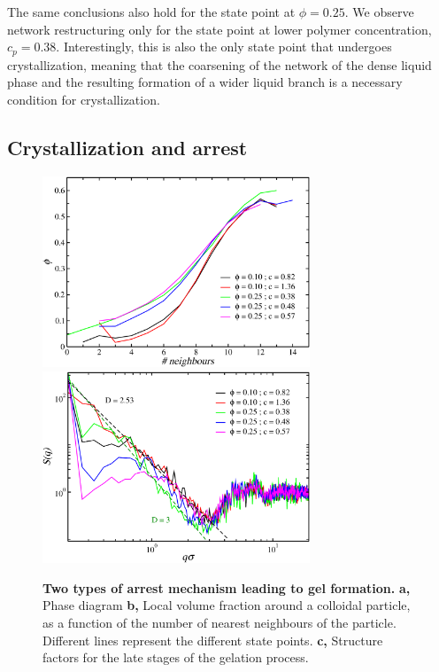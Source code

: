 \documentclass[twocolumn,superscriptaddress,showpacs,preprintnumbers,
amsmath,amssymb,prl]{revtex4-1}
\begin{document}
The same conclusions also hold for the state point at $\phi=0.25$. We observe network restructuring only for the state point
at lower polymer concentration, $c_p=0.38$. Interestingly, this is also the only state point that undergoes crystallization,
meaning that the coarsening of the network of the dense liquid phase and the resulting formation of a wider liquid branch is a necessary condition for crystallization. 

\subsection*{Crystallization and arrest}

\begin{figure}
 \centering
 \includegraphics[width=8cm]{oldfig/fig3b}
 \includegraphics[width=8cm]{oldfig/fig3c}
 \caption{{\bf Two types of arrest mechanism leading to gel formation.} \textbf{a,} Phase diagram \textbf{b,} Local volume fraction around a colloidal particle, as a function of the number of nearest neighbours of the particle.
 Different lines represent the different state points. {\bf c,} Structure factors for the late stages of the gelation process.} 
 \label{fig:statepoints}
\end{figure}
\end{document}
